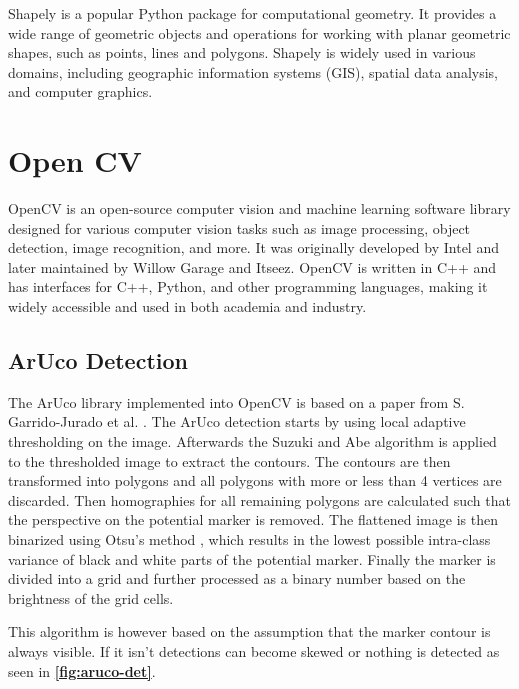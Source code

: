 \documentclass[10pt]{book}
\newcommand{\figureref}[1]{\textbf{\autoref{#1}}}
\begin{document}
Shapely is a popular Python package for computational geometry. It provides a wide range of geometric objects and operations for working with planar geometric shapes, such as points, lines and polygons. Shapely is widely used in various domains, including geographic information systems (GIS), spatial data analysis, and computer graphics.

\section{Open CV}

\ac{OpenCV} is an open-source computer vision and machine learning software library designed for various computer vision tasks such as image processing, object detection, image recognition, and more. It was originally developed by Intel and later maintained by Willow Garage and Itseez. \ac{OpenCV} is written in C++ and has interfaces for C++, Python, and other programming languages, making it widely accessible and used in both academia and industry.

\subsection{ArUco Detection}

The \ac{ArUco} library implemented into \ac{OpenCV} is based on a paper from S. Garrido-Jurado et al. \cite{garrido2014automatic}. The \ac{ArUco} detection starts by using local adaptive thresholding on the image. Afterwards the Suzuki
and Abe algorithm \cite{SUZUKI198532} is applied to the thresholded image to extract the contours. The contours are then transformed into polygons \cite{douglas1973algorithms} and all polygons with more or less than 4 vertices are discarded. Then homographies for all remaining polygons are calculated such that the perspective on the potential marker is removed. The flattened image is then binarized using Otsu's method \cite{4310076}, which results in the lowest possible intra-class variance of black and white parts of the potential marker. Finally the marker is divided into a grid and further processed as a binary number based on the brightness of the grid cells.

This algorithm is however based on the assumption that the marker contour is always visible. If it isn't detections can become skewed or nothing is detected as seen in \figureref{fig:aruco-det}.
\end{document}
